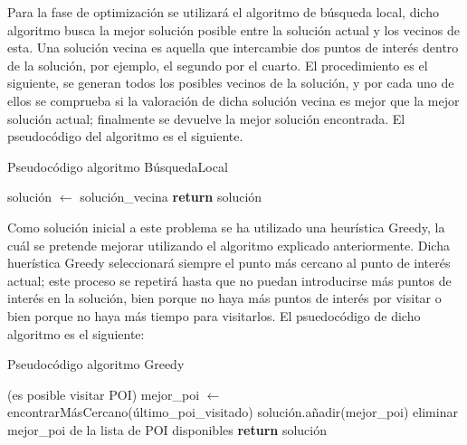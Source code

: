 \vspace{0.06in}
Para la fase de optimización se utilizará el algoritmo de búsqueda local, dicho algoritmo busca la mejor solución posible entre la solución actual y los vecinos de esta. Una solución vecina es aquella que intercambie dos puntos de interés dentro de la solución, por ejemplo, el segundo por el cuarto. El procedimiento es el siguiente, se generan todos los posibles vecinos de la solución, y por cada uno de ellos se comprueba si la valoración de dicha solución vecina es mejor que la mejor solución actual; finalmente se devuelve la mejor solución encontrada. El pseudocódigo del algoritmo es el siguiente.\newline
\begin{algorithm}[H]
	\caption{Pseudocódigo algoritmo BúsquedaLocal}
	\label{alg:local_search}
	\begin{algorithmic}
			\State solución $\gets$ solución\_vecina
		\EndIf
		\EndFor
		\State \textbf{return} solución
		\EndFunction
	\end{algorithmic}
\end{algorithm}

\vspace{0.06in}
Como solución inicial a este problema se ha utilizado una heurística Greedy, la cuál se pretende mejorar utilizando el algoritmo explicado anteriormente. Dicha huerística Greedy seleccionará siempre el punto más cercano al punto de interés actual; este proceso se repetirá hasta que no puedan introducirse más puntos de interés en la solución, bien porque no haya más puntos de interés por visitar o bien porque no haya más tiempo para visitarlos. El psuedocódigo de dicho algoritmo es el siguiente:\newline
\begin{algorithm}[H]
	\caption{Pseudocódigo algoritmo Greedy}
	\label{alg:greedy_alg}
	\begin{algorithmic}
		\Function{Greedy}{solución}
		\While(es posible visitar POI)
			\State mejor\_poi $\gets$ encontrarMásCercano(último\_poi\_visitado) 
			\State solución.añadir(mejor\_poi)
			\State eliminar mejor\_poi de la lista de POI disponibles
		\EndWhile
		\State \textbf{return} solución
		\EndFunction
	\end{algorithmic}
\end{algorithm}


